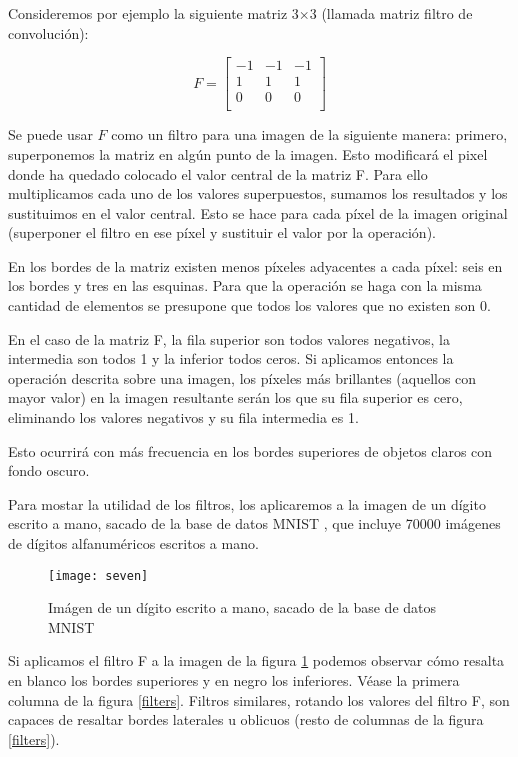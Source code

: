 Consideremos por ejemplo la siguiente matriz 3$\times$3 (llamada matriz filtro de convolución):

\[
  F=
  \left[ {\begin{array}{ccc}
   -1 & -1 & -1 \\
   1 & 1 & 1 \\
   0 & 0 & 0 \\
  \end{array} } \right]
\]

Se puede usar $F$ como un filtro para una imagen de la siguiente manera: primero, superponemos la matriz en algún punto de la imagen. Esto modificará el pixel donde ha quedado colocado el valor central de la matriz F. Para ello multiplicamos cada uno de los valores superpuestos, sumamos los resultados y los sustituimos en el valor central. Esto se hace para cada píxel de la imagen original (superponer el filtro en ese píxel y sustituir el valor por la operación).

En los bordes de la matriz existen menos píxeles adyacentes a cada píxel: seis en los bordes y tres en las esquinas. Para que la operación se haga con la misma cantidad de elementos se presupone que todos los valores que no existen son 0.

En el caso de la matriz F, la fila superior son todos valores negativos, la intermedia son todos 1 y la inferior todos ceros. Si aplicamos entonces la operación descrita sobre una imagen, los píxeles más brillantes (aquellos con mayor valor) en la imagen resultante serán los que su fila superior es cero, eliminando los valores negativos y su fila intermedia es 1. 

Esto ocurrirá con más frecuencia en los bordes superiores de objetos claros con fondo oscuro.

Para mostar la utilidad de los filtros, los aplicaremos a la imagen de un dígito escrito a mano, sacado de la base de datos MNIST \parencite{lecun-mnisthandwrittendigit-2010}, que incluye 70000 imágenes de dígitos alfanuméricos escritos a mano.

\begin{figure}
    \centering
    \caption{Imágen de un dígito escrito a mano, sacado de la base de datos MNIST}
  \label{seven}
  \texttt{[image: seven]}
\end{figure}

Si aplicamos el filtro F a la imagen de la figura \ref{seven} podemos observar cómo resalta en blanco los bordes superiores y en negro los inferiores. Véase la primera columna de la figura \ref{filters}. Filtros similares, rotando los valores del filtro F, son capaces de resaltar bordes laterales u oblicuos (resto de columnas de la figura \ref{filters}).

